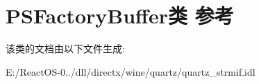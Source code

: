 \hypertarget{class_p_s_factory_buffer}{}\section{P\+S\+Factory\+Buffer类 参考}
\label{class_p_s_factory_buffer}


该类的文档由以下文件生成\+:\begin{DoxyCompactItemize}
\item 
E\+:/\+React\+O\+S-\/0../dll/directx/wine/quartz/quartz\+\_\+strmif.\+idl\end{DoxyCompactItemize}
